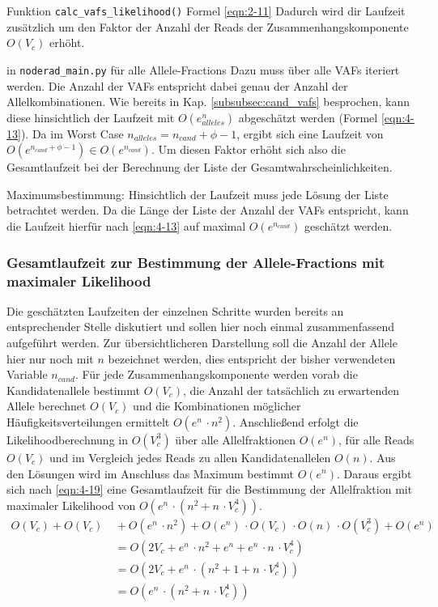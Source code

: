 Funktion \lstinline|calc_vafs_likelihood()| Formel \eqref{eqn:2-11}
Dadurch wird dir Laufzeit zusätzlich um den Faktor der Anzahl der Reads der Zusammenhangskomponente $ O(V_{c}) $ erhöht.

in \lstinline|noderad_main.py| für alle Allele-Fractions
Dazu muss über alle VAFs iteriert werden. Die Anzahl der VAFs entspricht dabei genau der Anzahl der Allelkombinationen. Wie bereits in Kap. \ref{subsubsec:cand_vafs} besprochen, kann diese hinsichtlich der Laufzeit mit $ O(e^n_{alleles}) $ abgeschätzt werden (Formel \eqref{eqn:4-13}). Da im Worst Case $n_{alleles} = n_{cand} + \phi - 1$, ergibt sich eine Laufzeit von $ O(e^{n_{cand} + \phi - 1}) \in O(e^{n_{cand}}) $. Um diesen Faktor erhöht sich also die Gesamtlaufzeit bei der Berechnung der Liste der Gesamtwahrscheinlichkeiten.

Maximumsbestimmung: 
Hinsichtlich der Laufzeit muss jede Lösung der Liste betrachtet werden. Da die Länge der Liste der Anzahl der VAFs entspricht, kann die Laufzeit hierfür nach \eqref{eqn:4-13} auf maximal $ O(e^{n_{cand}}) $ geschätzt werden.


\subsubsection{Gesamtlaufzeit zur Bestimmung der Allele-Fractions mit maximaler Likelihood} \label{subsec:al_compl}
Die geschätzten Laufzeiten der einzelnen Schritte wurden bereits an entsprechender Stelle diskutiert und sollen hier noch einmal zusammenfassend aufgeführt werden. Zur übersichtlicheren Darstellung soll die Anzahl der Allele hier nur noch mit $n$ bezeichnet werden, dies entspricht der bisher verwendeten Variable $n_{cand}$. Für jede Zusammenhangskomponente werden vorab die Kandidatenallele bestimmt $ O(V_{c}) $, die Anzahl der tatsächlich zu erwartenden Allele berechnet $ O(V_{c}) $ und die Kombinationen möglicher Häufigkeitsverteilungen ermittelt $ O(e^{n} \, \cdotp n^2) $. Anschließend erfolgt die Likelihoodberechnung in $ O(V_{c}^3) $ über alle Allelfraktionen $ O(e^{n}) $, für alle Reads $ O(V_{c}) $ und im Vergleich jedes Reads zu allen Kandidatenallelen $ O(n) $. Aus den Lösungen wird im Anschluss das Maximum bestimmt $ O(e^{n}) $. Daraus ergibt sich nach \ref{eqn:4-19} eine Gesamtlaufzeit für die Bestimmung der Allelfraktion mit maximaler Likelihood von $ O(e^n \, \cdotp (n^2 + n \, \cdotp V_{c}^4)) $. 
\begin{equation} \label{eqn:4-19}
\tag{4-19}
\begin{aligned}
O(V_{c}) +  O(V_{c}) &\ {} + O(e^n \, \cdotp n^2) + O(e^n) \, \cdotp O(V_{c}) \, \cdotp O(n) \, \cdotp O(V_{c}^3) + O(e^n)\\
&\ =  O(2 V_{c} + e^n \, \cdotp n^2 + e^n + e^n \, \cdotp n \, \cdotp V_{c}^4)\\
&\ = O(2 V_{c} + e^n \, \cdotp (n^2 + 1 + n \, \cdotp V_{c}^4))\\
&\ = O(e^n \, \cdotp (n^2 + n \, \cdotp V_{c}^4)) \\
\end{aligned}
\end{equation}

